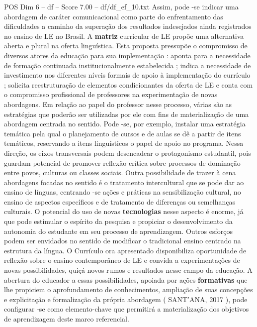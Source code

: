 \begin{textsample}{POS Dim 6 – df – Score 7.00 – df/df\_ef\_10.txt}
Assim, pode -se indicar uma abordagem de caráter comunicacional como parte do enfrentamento das dificuldades a caminho da superação dos resultados indesejados ainda registrados no ensino de LE no Brasil.
A \textbf{matriz} curricular de LE propõe uma alternativa aberta e plural na oferta linguística.
Esta proposta pressupõe o compromisso de diversos atores da educação para sua implementação : aponta para a necessidade de formação continuada institucionalmente estabelecida ; indica a necessidade de investimento nos diferentes níveis formais de apoio à implementação do currículo ; solicita reestruturação de elementos condicionantes da oferta de LE e conta com o compromisso profissional de professores na experimentação de novas abordagens.
Em relação ao papel do professor nesse processo, várias são as estratégias que poderão ser utilizadas por ele com fins de materialização de uma abordagem centrada no sentido.
Pode -se, por exemplo, instalar uma estratégia temática pela qual o planejamento de cursos e de aulas se dê a partir de itens temáticos, reservando a itens linguísticos o papel de apoio no programa.
Nessa direção, os eixos transversais podem desencadear o protagonismo estudantil, pois guardam potencial de promover reflexão crítica sobre processos de dominação entre povos, culturas ou classes sociais.
Outra possibilidade de trazer à cena abordagens focadas no sentido é o tratamento intercultural que se pode dar ao ensino de línguas, centrando -se ações e práticas na sensibilização cultural, no ensino de aspectos específicos e de tratamento de diferenças ou semelhanças culturais.
O potencial do uso de novas \textbf{tecnologias} nesse aspecto é enorme, já que pode estimular o espírito da pesquisa e propiciar o desenvolvimento da autonomia do estudante em seu processo de aprendizagem.
Outros esforços podem ser envidados no sentido de modificar o tradicional ensino centrado na estrutura da língua.
O Currículo ora apresentado disponibiliza oportunidade de reflexão sobre o ensino contemporâneo de LE e convida a experimentações de novas possibilidades, quiçá novos rumos e resultados nesse campo da educação.
A abertura do educador a essas possibilidades, apoiada por ações \textbf{formativas} que lhe propiciem o aprofundamento de conhecimentos, ampliação de suas concepções e explicitação e formalização da própria abordagem ( SANT’ANA, 2017 ), pode configurar -se como elemento-chave que permitirá a materialização dos objetivos de aprendizagem deste marco referencial.

\end{textsample}
